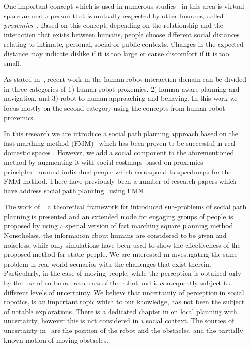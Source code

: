 One important concept which is used in numerous studies~\cite{Mumm2011,Takayama2009,Walters2011,ferrer2013robot} in this area is virtual space around a person that is mutually respected by other humans, called \textit{proxemics}~\cite{Hall1969}.
Based on this concept, depending on the relationship and the interaction that exists between humans, people choose different social distances relating to intimate, personal, social or public contexts.
Changes in the expected distance may indicate dislike if it is too large or cause discomfort if it is too small.



As stated in~\cite{gomez2013social}, recent work in the human-robot interaction domain can be divided in three categories of 1) human-robot proxemics, 2) human-aware planning and navigation, and 3) robot-to-human approaching and behaving. In this work we focus mostly on the second category using the concepts from human-robot proxemics. %

In this research we are introduce a social path planning approach based on the fast marching method (FMM)~\cite{sethian1999fast} which has been proven to be successful in real domestic spaces \cite{ventura2015}. However, we add a social component to the aforementioned method by augmenting it with social costmaps \textemdash based on proxemics principles~\cite{kirby2009companion}\textemdash~around individual people which correspond to speedmaps for the FMM method. There have previously been a number of research papers which have address social path planning~\cite{gomez2014fast,gomez2013social} using FMM. 

The work of ~\cite{gomez2014fast} a theoretical framework for introduced sub-problems of social path planning is presented and an extended mode for engaging groups of people is proposed by using a special version of fast marching square planning method~\cite{valero2013fast}. Nonetheless, the information about humans are considered to be given and noiseless, while only simulations have been used to show the effectiveness of the proposed method for static people. We are interested in investigating the same problem in real-world scenarios with the challenges that exist therein. Particularly, in the case of moving people, while the perception is obtained only by the use of on-board resources of the robot and is consequently subject to different levels of uncertainty. 
We believe that uncertainty of perception in social robotics, is an important topic which to our knowledge, has not been the subject of notable explorations. There is a dedicated chapter in \cite{correa2014uncertainty} on local planning with uncertainty, however this is not considered in a social context. The sources of uncertainty in~\cite{correa2014uncertainty} are the position of the robot and the obstacles, and the partially known motion of moving obstacles.



